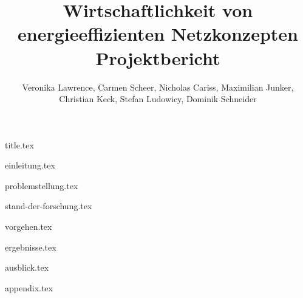 \documentclass[
  12pt,
  titlepage,
  parskip,
  draft=false,
  headsepline=true,
  footsepline=true,
  captions=tableheading
]{scrartcl}
\title{\huge{Wirtschaftlichkeit von energieeffizienten Netzkonzepten} \\ \large{Projektbericht}}
\author{Veronika Lawrence, Carmen Scheer, Nicholas Cariss, Maximilian Junker,\\ Christian Keck, Stefan Ludowicy, Dominik Schneider}
\begin{document}
	{title.tex}
	
	
	\newpage
	\tableofcontents{}
	\newpage
	\listoffigures
	\listoftables
	\newpage
	
	
	\pagestyle{headings}
	{einleitung.tex}
	
	{problemstellung.tex}
	
	{stand-der-forschung.tex}
	
	{vorgehen.tex}
	
	{ergebnisse.tex}
	
	{ausblick.tex}
	
	\newpage
	\printbibliography[heading=bibintoc]
	
	\newpage
	{appendix.tex}	
	
	
\end{document}

